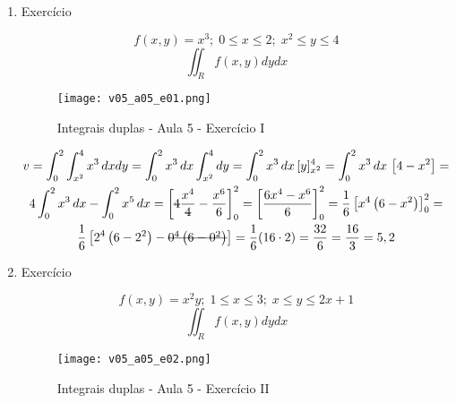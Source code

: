 \begin{enumerate}
	\item Exercício
	
	\begin{equation*}
		f(x,y) = x^3;\; 0 \leq x \leq 2;\; x^2 \leq y \leq 4	
	\end{equation*}
	\begin{equation*}
		\iint_R f(x, y) dy dx
	\end{equation*}
	
	\begin{figure}[htb]
		\caption{Integrais duplas - Aula 5 - Exercício I}
		\label{v05_a05_e01}
		\centering
		\texttt{[image: v05\_a05\_e01.png]}		
	\end{figure}
	
	\begin{gather*}
		v = \int_0^2 \int_{x^2}^4 x^3\, dx dy = \int_0^2 x^3\, dx \int_{x^2}^4 dy = \int_0^2 x^3\, dx\, [y]_{x^2}^4 = \int_0^2 x^3\, dx\, \left[4 - x^2\right] =\\ 4\int_0^2 x^3\, dx - \int_0^2 x^5\, dx = \left[\overstrike{4}\dfrac{x^4}{\overstrike{4}} - \frac{x^6}{6}\right]_0^2 = \left[\dfrac{6x^4 - x^6}{6}\right]_0^2 = \frac{1}{6}\left[x^4\left(6 - x^2\right)\right]_0^2 =\\ \frac{1}{6}\left[2^4\left(6 - 2^2\right) - \overstrike{0^4\left(6 - 0^2\right)}\right] = \dfrac{1}{6}(16\cdot2) = \dfrac{32}{6} = \dfrac{16}{3} = 5,2
	\end{gather*}
	
	\item Exercício
	
	\begin{equation*}
		f(x,y) = x^2y;\; 1 \leq x \leq 3;\; x \leq y \leq 2x + 1
	\end{equation*}
	\begin{equation*}
		\iint_R f(x, y) dy dx
	\end{equation*}
	
	\begin{figure}[htb]
		\caption{Integrais duplas - Aula 5 - Exercício II}
		\label{v05_a05_e02}
		\centering
		\texttt{[image: v05\_a05\_e02.png]}		
	\end{figure}
	

\end{enumerate}
